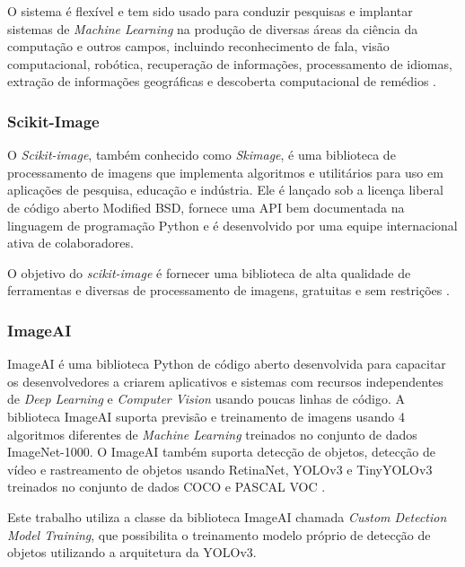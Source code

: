 O sistema é flexível e tem sido usado para conduzir pesquisas e implantar sistemas de \textit{Machine Learning} na produção de diversas áreas da ciência da computação e outros campos, incluindo reconhecimento de fala, visão computacional, robótica, recuperação de informações, processamento de idiomas, extração de informações geográficas e descoberta computacional de remédios \cite{abadi2016tensorflow}.




\subsubsection{Scikit-Image}

O \textit{Scikit-image}, também conhecido como \textit{Skimage}, é uma biblioteca de processamento de imagens que implementa algoritmos e utilitários para uso em aplicações de pesquisa, educação e indústria. Ele é lançado sob a licença liberal de código aberto Modified BSD, fornece uma API bem documentada na linguagem de programação Python e é desenvolvido por uma equipe internacional ativa de colaboradores.

O objetivo do \textit{scikit-image} é fornecer uma biblioteca de alta qualidade de ferramentas e diversas de processamento de imagens, gratuitas e sem restrições \cite{skimage}.


\subsubsection{ImageAI}

ImageAI é uma biblioteca Python de código aberto desenvolvida para capacitar os desenvolvedores a criarem aplicativos e sistemas com recursos independentes de \textit{Deep Learning} e \textit{Computer Vision} usando poucas linhas de código.
%
A biblioteca ImageAI suporta previsão e treinamento de imagens usando 4 algoritmos diferentes de \textit{Machine Learning} treinados no conjunto de dados ImageNet-1000. O ImageAI também suporta detecção de objetos, detecção de vídeo e rastreamento de objetos usando RetinaNet, YOLOv3 e TinyYOLOv3 treinados no conjunto de dados COCO e PASCAL VOC \cite{ImageAI}.

Este trabalho utiliza a classe da biblioteca ImageAI chamada \textit{Custom Detection Model Training}, que possibilita o treinamento modelo próprio de detecção de objetos utilizando a arquitetura da YOLOv3.

